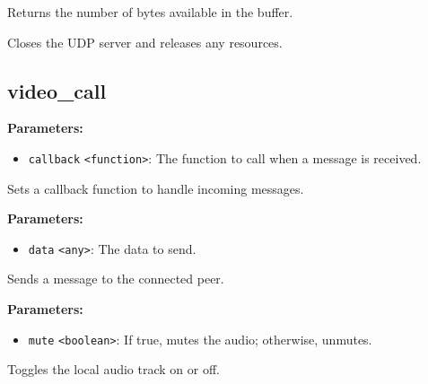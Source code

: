 \documentclass[12pt,a4paper]{article}
\begin{document}
\noindent Returns the number of bytes available in the buffer.

\vspace{5mm}
\noindent {}


\noindent Closes the UDP server and releases any resources.


\subsection{video\_call}
\vspace{5mm}
\noindent {}


\noindent \textbf{Parameters:}
\begin{itemize}
  \item \texttt{callback} \texttt{<function>}: The function to call when a message is received.
\end{itemize}

\noindent Sets a callback function to handle incoming messages.

\vspace{5mm}
\noindent {}


\noindent \textbf{Parameters:}
\begin{itemize}
  \item \texttt{data} \texttt{<any>}: The data to send.
\end{itemize}

\noindent Sends a message to the connected peer.

\vspace{5mm}
\noindent {}


\noindent \textbf{Parameters:}
\begin{itemize}
  \item \texttt{mute} \texttt{<boolean>}: If true, mutes the audio; otherwise, unmutes.
\end{itemize}

\noindent Toggles the local audio track on or off.
\end{document}
